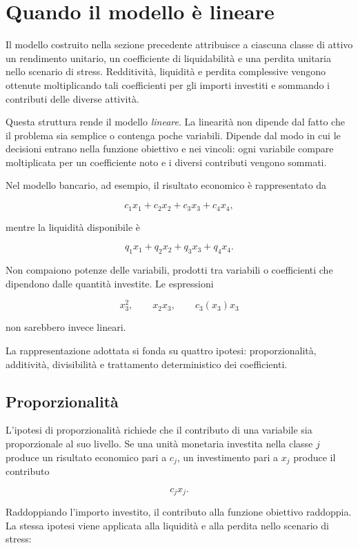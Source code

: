 \section{Quando il modello \`e lineare}

\label{sec:cap11-linearita}

Il modello costruito nella sezione precedente attribuisce a ciascuna classe
di attivo un rendimento unitario, un coefficiente di liquidabilit\`a e una
perdita unitaria nello scenario di stress. Redditivit\`a, liquidit\`a e
perdita complessive vengono ottenute moltiplicando tali coefficienti per gli
importi investiti e sommando i contributi delle diverse attivit\`a.

Questa struttura rende il modello \emph{lineare}. La linearit\`a non dipende
dal fatto che il problema sia semplice o contenga poche variabili. Dipende dal
modo in cui le decisioni entrano nella funzione obiettivo e nei vincoli: ogni
variabile compare moltiplicata per un coefficiente noto e i diversi contributi
vengono sommati.

Nel modello bancario, ad esempio, il risultato economico \`e rappresentato da

\[
c_1x_1+c_2x_2+c_3x_3+c_4x_4,
\]

\noindent mentre la liquidit\`a disponibile \`e

\[
q_1x_1+q_2x_2+q_3x_3+q_4x_4.
\]

Non compaiono potenze delle variabili, prodotti tra variabili o coefficienti
che dipendono dalle quantit\`a investite. Le espressioni

\[
x_3^2,
\qquad
x_2x_3,
\qquad
c_3(x_3)x_3
\]

\noindent non sarebbero invece lineari.

La rappresentazione adottata si fonda su quattro ipotesi: proporzionalit\`a,
additivit\`a, divisibilit\`a e trattamento deterministico dei coefficienti.

\subsection{Proporzionalit\`a}

L'ipotesi di proporzionalit\`a richiede che il contributo di una variabile sia
proporzionale al suo livello. Se una unit\`a monetaria investita nella classe
$j$ produce un risultato economico pari a $c_j$, un investimento pari a
$x_j$ produce il contributo

\[
c_jx_j.
\]

Raddoppiando l'importo investito, il contributo alla funzione obiettivo
raddoppia. La stessa ipotesi viene applicata alla liquidit\`a e alla perdita
nello scenario di stress:

